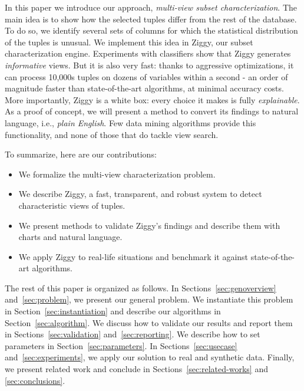 In this paper we introduce our approach, \emph{multi-view subset
characterization}. The main idea is to show how the selected tuples differ from
the rest of the database. To do so, we identify several sets of columns for
which the statistical distribution of the tuples is unusual.  We implement this
idea in Ziggy, our subset characterization engine. Experiments with
classifiers show that Ziggy generates \emph{informative} views.
But it is also very fast: thanks to aggressive optimizations, it can process
10,000s tuples on dozens of variables within a second - an order of magnitude
faster than state-of-the-art algorithms, at minimal accuracy costs.  More
importantly, Ziggy is a white box: every choice it makes is fully
\emph{explainable}.  As a proof of concept, we will present a method to convert
its findings to natural language, i.e., \emph{plain English}. Few data
mining algorithms provide this functionality, and none of those that do tackle
view search.

To summarize, here are our contributions:
\begin{itemize} 
    \item We formalize the multi-view characterization problem.
    \item We describe Ziggy, a fast, transparent, and robust system to detect
        characteristic views of tuples.
    \item We present methods to validate Ziggy's findings and describe them
        with charts and natural language.
    \item We apply Ziggy to real-life
        situations and benchmark it against state-of-the-art algorithms.
    \end{itemize}

The rest of this paper is organized as follows.  In
Sections~\ref{sec:genoverview} and~\ref{sec:problem}, we present our general
problem. We instantiate this problem in Section~\ref{sec:instantiation} and
describe our algorithms in Section~\ref{sec:algorithm}. We discuss how to
validate our results and report them in Sections~\ref{sec:validation}
and~\ref{sec:reporting}. We describe how to set parameters in
Section~\ref{sec:parameters}. In Sections~\ref{sec:usecase}
and~\ref{sec:experiments}, we apply our solution to real and synthetic data.
Finally, we present related work and conclude in
Sections~\ref{sec:related-works} and \ref{sec:conclusions}.

